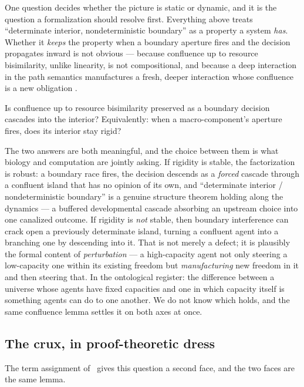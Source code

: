 One question decides whether the picture is static or dynamic, and it is the question a
formalization should resolve first. Everything above treats ``determinate interior,
nondeterministic boundary'' as a property a system \emph{has}. Whether it \emph{keeps}
the property when a boundary aperture fires and the decision propagates inward is not
obvious --- because confluence up to resource bisimilarity, unlike linearity, is not
compositional, and because a deep interaction in the path semantics manufactures a fresh,
deeper interaction whose confluence is a new obligation \cite{paths}.

\begin{question}\label{ndo:q:crux}
Is confluence up to resource bisimilarity preserved as a boundary decision cascades into
the interior? Equivalently: when a macro-component's aperture fires, does its interior
stay rigid?
\end{question}

\noindent
The two answers are both meaningful, and the choice between them is what biology and
computation are jointly asking. If rigidity is stable, the factorization is robust: a
boundary race fires, the decision descends as a \emph{forced} cascade through a confluent
island that has no opinion of its own, and ``determinate interior / nondeterministic
boundary'' is a genuine structure theorem holding along the dynamics --- a buffered
developmental cascade absorbing an upstream choice into one canalized outcome. If rigidity
is \emph{not} stable, then boundary interference can crack open a previously determinate
island, turning a confluent agent into a branching one by descending into it. That is not
merely a defect;
it is plausibly the formal content of \emph{perturbation} --- a high-capacity agent not
only steering a low-capacity one within its existing freedom but \emph{manufacturing} new
freedom in it and then steering that. In the ontological register: the difference between a
universe whose agents have fixed capacities and one in which capacity itself is something
agents can do to one another. We do not know which holds, and the same confluence lemma
settles it on both axes at once.


\subsection{The crux, in proof-theoretic dress}

The term assignment of \chChs\ gives this question a second face, and the two faces
are the same lemma.

